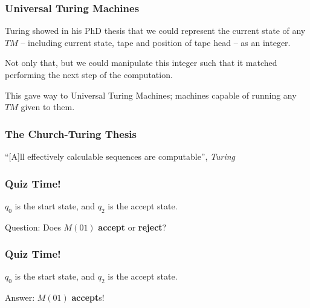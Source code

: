 \documentclass[aspectratio=169]{beamer}
\begin{document}
\begin{frame}
\frametitle{Universal Turing Machines}
Turing showed in his PhD thesis that we could represent the current state of any $TM$ -- including current state, tape and position of tape head -- as an integer.

Not only that, but we could manipulate this integer such that it matched performing the next step of the computation.

This gave way to Universal Turing Machines; machines capable of running any $TM$ given to them.
\end{frame}

\begin{frame}
\frametitle{The Church-Turing Thesis}
\centerline{``[A]ll effectively calculable sequences are computable'', {\em Turing}}
\end{frame}

\begin{frame}
\frametitle{Quiz Time!}

\begin{center}
\end{center}

$q_0$ is the start state, and $q_2$ is the accept state.

Question: Does $M(01)$ {\bf accept} or {\bf reject}?
\end{frame}

\begin{frame}
\frametitle{Quiz Time!}

\begin{center}
\end{center}

$q_0$ is the start state, and $q_2$ is the accept state.

Answer: $M(01)$ {\bf accept}s!
\end{frame}
\end{document}

